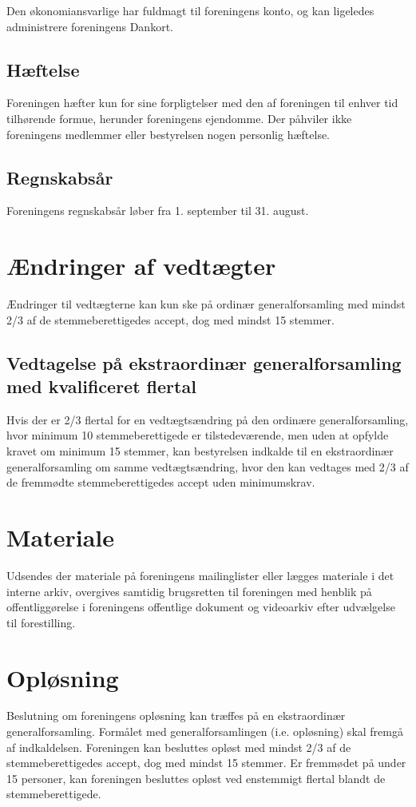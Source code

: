 \documentclass[a4paper,11pt,danish]{article}
\begin{document}
\noindent Den økonomiansvarlige har fuldmagt til foreningens konto, og kan
ligeledes administrere foreningens Dankort.

\subsection{Hæftelse}
Foreningen hæfter kun for sine forpligtelser med den af foreningen til enhver
tid tilhørende formue, herunder foreningens ejendomme. Der påhviler ikke
foreningens medlemmer eller bestyrelsen nogen personlig hæftelse.

\subsection{Regnskabsår}
Foreningens regnskabsår løber fra 1. september til 31. august.

\section{Ændringer af vedtægter}
Ændringer til vedtægterne kan kun ske på ordinær generalforsamling med mindst
2/3 af de stemmeberettigedes accept, dog med mindst 15 stemmer.

\subsection{Vedtagelse på ekstraordinær generalforsamling med kvalificeret
flertal}
Hvis der er 2/3 flertal for en vedtægtsændring på den ordinære
generalforsamling, hvor minimum 10 stemmeberettigede er tilstedeværende, men
uden at opfylde kravet om minimum 15 stemmer, kan bestyrelsen indkalde til en
ekstraordinær generalforsamling om samme vedtægtsændring, hvor den kan
vedtages med 2/3 af de fremmødte stemmeberettigedes accept uden minimumskrav.

\section{Materiale}
Udsendes der materiale på foreningens mailinglister eller lægges materiale i
det interne arkiv, overgives samtidig brugsretten til foreningen med henblik på
offentliggørelse i foreningens offentlige dokument og videoarkiv efter
udvælgelse til forestilling.

\section{Opløsning}
Beslutning om foreningens opløsning kan træffes på en ekstraordinær
generalforsamling. Formålet med generalforsamlingen (i.e. opløsning) skal
fremgå af indkaldelsen. Foreningen kan besluttes opløst med mindst 2/3 af de
stemmeberettigedes accept, dog med mindst 15 stemmer. Er fremmødet på under 15
personer, kan foreningen besluttes opløst ved enstemmigt flertal blandt de
stemmeberettigede.\\
\end{document}
